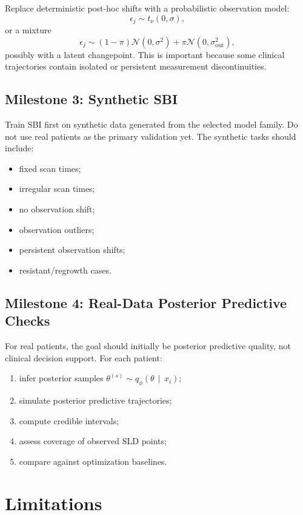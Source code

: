 \documentclass[11pt,a4paper]{article}
\newcommand{\Normal}{\mathcal{N}}
\newcommand{\given}{\,\middle|\,}
\begin{document}
Replace deterministic post-hoc shifts with a probabilistic observation model:
\[
    \epsilon_j \sim t_\nu(0,\sigma),
\]
or a mixture
\[
    \epsilon_j \sim (1-\pi)\Normal(0,\sigma^2)+\pi\Normal(0,\sigma_{\mathrm{out}}^2),
\]
possibly with a latent changepoint. This is important because some clinical trajectories contain isolated or persistent measurement discontinuities.

\subsection{Milestone 3: Synthetic SBI}

Train SBI first on synthetic data generated from the selected model family. Do not use real patients as the primary validation yet. The synthetic tasks should include:
\begin{itemize}[leftmargin=2em]
    \item fixed scan times;
    \item irregular scan times;
    \item no observation shift;
    \item observation outliers;
    \item persistent observation shifts;
    \item resistant/regrowth cases.
\end{itemize}

\subsection{Milestone 4: Real-Data Posterior Predictive Checks}

For real patients, the goal should initially be posterior predictive quality, not clinical decision support. For each patient:
\begin{enumerate}[leftmargin=2em]
    \item infer posterior samples $\theta^{(s)}\sim q_\phi(\theta\given x_i)$;
    \item simulate posterior predictive trajectories;
    \item compute credible intervals;
    \item assess coverage of observed SLD points;
    \item compare against optimization baselines.
\end{enumerate}

\section{Limitations}
\end{document}
